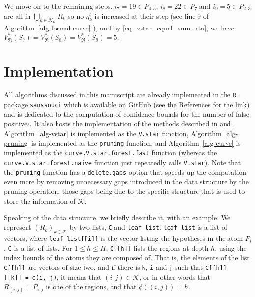 \documentclass[
  11pt,
  a4paper,
]{article}
\theoremstyle{definition}
\theoremstyle{plain}
\theoremstyle{plain}
\theoremstyle{plain}
\theoremstyle{definition}
\theoremstyle{remark}
\begin{document}
We move on to the remaining steps. \(i_7=19\in P_{4:5}\),
\(i_8=22\in P_{7}\) and \(i_9=5\in P_{2:3}\) are all in
\(\bigcup_{k\in\mathcal{K}^-_6}R_k\) so no \(\eta_k^t\) is increased at
their step (see line 9 of  Algorithm~\ref{alg-formal-curve} ), and by
\eqref{eq_vstar_equal_sum_eta}, we have
\(V^*_{\mathfrak{R}}(S_7)=V^*_{\mathfrak{R}}(S_8)=V^*_{\mathfrak{R}}(S_9)=5\).

\section{Implementation}\label{sec-implementation}

All algorithms discussed in this manuscript are already implemented in
the \texttt{R} \citep{R-base} package \texttt{sanssouci}
\citep{sanssouci} which is available on GitHub (see the References for
the link) and is dedicated to the computation of confidence bounds for
the number of false positives. It also hosts the implementation of the
methods described in \citet{MR4124323} and
\citet{10.1093/bioinformatics/btac693}.  Algorithm~\ref{alg-vstar}  is
implemented as the \texttt{V.star} function,
 Algorithm~\ref{alg-pruning}  is implemented as the \texttt{pruning}
function, and  Algorithm~\ref{alg-curve}  is implemented as the
\texttt{curve.V.star.forest.fast} function (whereas the
\texttt{curve.V.star.forest.naive} function just repeatedly calls
\texttt{V.star}). Note that the \texttt{pruning} function has a
\texttt{delete.gaps} option that speeds up the computation even more by
removing unnecessary gaps introduced in the data structure by the
pruning operation, those gaps being due to the specific structure that
is used to store the information of \(\mathcal{K}\).

Speaking of the data structure, we briefly describe it, with an example.
We represent \((R_k)_{k\in\mathcal{K}}\) by two lists, \texttt{C} and
\texttt{leaf\_list}. \texttt{leaf\_list} is a list of vectors, where
\texttt{leaf\_list{[}{[}i{]}{]}} is the vector listing the hypotheses in
the atom \(P_i\). \texttt{C} is a list of lists. For \(1\leq h\leq H\),
\texttt{C{[}{[}h{]}{]}} lists the regions at depth \(h\), using the
index bounds of the atoms they are composed of. That is, the elements of
the list \texttt{C{[}{[}h{]}{]}} are vectors of size two, and if there
is \texttt{k}, \texttt{i} and \texttt{j} such that
\texttt{C{[}{[}h{]}{]}{[}{[}k{]}{]}\ =\ c(i,\ j)}, it means that
\((i, j)\in\mathcal{K}\), or in other words that \(R_{(i,j)}=P_{i:j}\)
is one of the regions, and that \(\phi((i, j))=h\).
\end{document}
